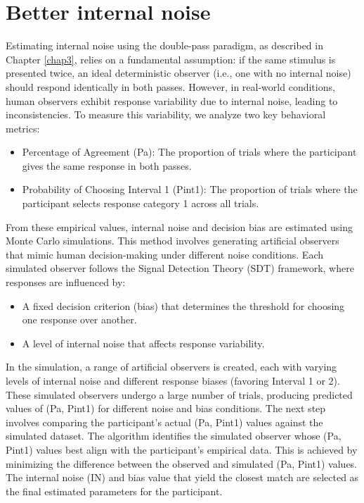 \section {Better internal noise}

Estimating internal noise using the double-pass paradigm, as described in Chapter \ref{chap3}, relies on a fundamental assumption: if the same stimulus is presented twice, an ideal deterministic observer (i.e., one with no internal noise) should respond identically in both passes. However, in real-world conditions, human observers exhibit response variability due to internal noise, leading to inconsistencies. To measure this variability, we analyze two key behavioral metrics:
\begin{itemize}
    \item Percentage of Agreement (Pa): The proportion of trials where the participant gives the same response in both passes.
    \item Probability of Choosing Interval 1 (Pint1): The proportion of trials where the participant selects response category 1 across all trials.
\end{itemize}

From these empirical values, internal noise and decision bias are estimated using Monte Carlo simulations. This method involves generating artificial observers that mimic human decision-making under different noise conditions. Each simulated observer follows the Signal Detection Theory (SDT) framework, where responses are influenced by:
\begin{itemize}
    \item A fixed decision criterion (bias) that determines the threshold for choosing one response over another.
    \item A level of internal noise that affects response variability.
\end{itemize}
In the simulation, a range of artificial observers is created, each with varying levels of internal noise and different response biases (favoring Interval 1 or 2). These simulated observers undergo a large number of trials, producing predicted values of (Pa, Pint1) for different noise and bias conditions. The next step involves comparing the participant’s actual (Pa, Pint1) values against the simulated dataset. The algorithm identifies the simulated observer whose (Pa, Pint1) values best align with the participant’s empirical data. This is achieved by minimizing the difference between the observed and simulated (Pa, Pint1) values. The internal noise (IN) and bias value that yield the closest match are selected as the final estimated parameters for the participant.

